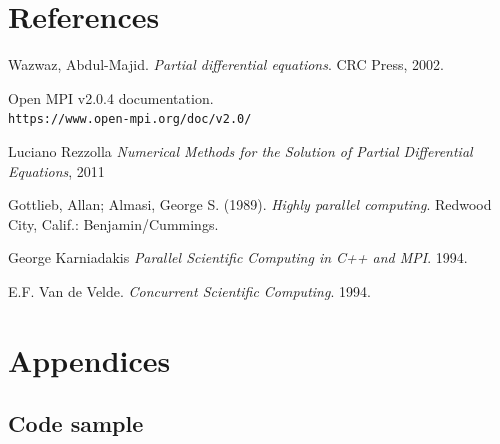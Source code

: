 \documentclass{article}
\begin{document}
        \newpage
        \section{References}
        \begin{thebibliography}{9}
            Wazwaz, Abdul-Majid. \textit{Partial differential equations}. CRC Press, 2002.
            
            Open MPI v2.0.4 documentation.
            \\\texttt{https://www.open-mpi.org/doc/v2.0/}
            
            Luciano Rezzolla \textit{Numerical Methods for the Solution of Partial Differential Equations}, 2011
            
            Gottlieb, Allan; Almasi, George S. (1989). \textit{Highly parallel computing}. Redwood City, Calif.: Benjamin/Cummings.
            
            George Karniadakis \textit{Parallel Scientific Computing in C++ and MPI}. 1994.

            E.F. Van de Velde. \textit{Concurrent Scientific Computing}. 1994.

    
            
        \end{thebibliography}
        \newpage
        \section{Appendices}
            \subsection{Code sample}
                
                
                
                
        
\end{document}
